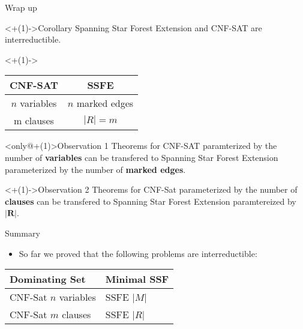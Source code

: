 \documentclass{beamer}
\begin{document}
\begin{frame}[t]{Wrap up}
	\begin{block}<+(1)->{Corollary}
		Spanning Star Forest Extension and CNF-SAT are interreductible.
	\end{block}
	\bigskip
	\def\arraystretch{1.5}
	\onslide<+(1)-> {
		\begin{center}
			\begin{tabular}{c|c}
				CNF-SAT & SSFE \\
				\hline
				$n$ variables & $n$ marked edges \\
				\hline
				m clauses & $|R| = m$
			\end{tabular}
		\end{center}
	}
	\vfill
	

	\begin{block}<only@+(1)>{Observation 1}
		Theorems for CNF-SAT paramterized by the number of \textbf{variables} can be transfered to Spanning Star Forest Extension parameterized by the number of \textbf{marked edges}.
	\end{block}
	
	\begin{block}<+(1)->{Observation 2}
		Theorems for CNF-Sat parameterized by the number of \textbf{clauses} can be transfered to Spanning Star Forest Extension paramtereized by $\mathbf{|R|}$.
	\end{block}

\end{frame}

\begin{frame}[t]{Summary}
	\begin{itemize}[<+->]
		\item[] So far we proved that the following problems are interreductible:
	\end{itemize}
	\vfill
	\onslide<+-> {
		\begin{center}
			\def\arraystretch{1.5}
			\begin{tabular}{l|l}
				Dominating Set & Minimal SSF \\				
				\hline
				CNF-Sat $n$ variables & SSFE $|M|$ \\
				\hline
				CNF-Sat $m$ clauses & SSFE $|R|$ \\
			\end{tabular}
		\end{center}
	}
	\vfill
\end{frame}
\end{document}
